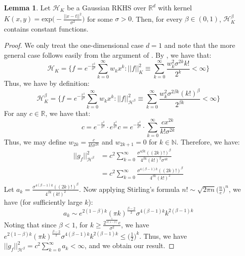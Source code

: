 \documentclass[accepted]{article}
\theoremstyle{definition}
\newtheorem{lemma}[theorem]{Lemma}
\begin{document}
\begin{lemma}
\label{Gaussian Interpolation Spaces include Constants}
Let $\mathcal{H}_K$ be a Gaussian RKHS over $\mathbb{R}^d$ with kernel $K(x, y) = \text{exp}\Big(-\frac{||x - t||^2}{\sigma^2}\Big)$ for some $\sigma > 0$. Then, for every $\beta \in (0, 1)$, $\mathcal{H}^{\beta}_K$ contains constant functions.
\end{lemma}
\begin{proof}
We only treat the one-dimensional case $d = 1$ and note that the more general case follows easily from the argument of \cite{steinwart2008support}. By \cite{minh2010some}, we have that:
\begin{equation*}
    \mathcal{H}_{K} = \Big\{f = e^{-\frac{x^2}{\sigma^2}}\sum_{k = 0}^{\infty} w_k x^{k}: ||f||_{K}^2 \equiv \sum_{k = 0}^{\infty} \frac{w^2_k \sigma^{2k} k!}{2^k} < \infty \Big\}
\end{equation*}
Thus, we have by definition:
\begin{equation*}
    \mathcal{H}^{\beta}_{K} = \Big\{f = e^{-\frac{x^2}{\sigma^2}}\sum_{k = 0}^{\infty} w_k x^{k}: ||f||_{\mathcal{H}^{\beta}}^2 \equiv \sum_{k = 0}^{\infty} \frac{w^2_k \sigma^{2\beta k} (k!)^{\beta}}{2^{\beta k}} < \infty \Big\}
\end{equation*}
For any $c \in \mathbb{R}$, we have that:
\begin{equation*}
    c = e^{-\frac{x^2}{\sigma^2}}  \cdot e^{\frac{x^2}{\sigma^2}} c = e^{-\frac{x^2}{\sigma^2}}  \cdot \sum_{k = 0}^{\infty} \frac{cx^{2k}}{k! \sigma^{2k}}
\end{equation*}
Thus, we may define $w_{2k} = \frac{c}{k! \sigma^{2k}}$ and $w_{2k+1} = 0$ for $k \in \mathbb{N}$. Therefore, we have:
\begin{align*}
    ||g_f||_{\mathcal{H}^{\beta}}^2 & = c^2\sum_{k = 0}^{\infty} \frac{\sigma^{4\beta k} ((2k)!)^{\beta}}{4^{\beta k}(k!)^2 \sigma^{4k}} \\
    & = c^2\sum_{k = 0}^{\infty} \frac{\sigma^{4(\beta - 1) k} ((2k)!)^{\beta}}{4^{\beta k}(k!)^2}
\end{align*}
Let $a_{k} = \frac{\sigma^{4(\beta - 1) k} ((2k)!)^{\beta}}{4^{\beta k}(k!)^2}$. Now applying Stirling's formula $n! \sim \sqrt{2\pi n} \Big(\frac{n}{e}\Big)^n$, we have (for sufficiently large $k$):
\begin{equation*}
    a_{k} \sim e^{2(1 - \beta)k}(\pi k)^{\frac{\beta - 2}{2}} \sigma^{4(\beta - 1) k} k^{2(\beta - 1)k} 
\end{equation*}
Noting that since $\beta < 1$, for $k \geq \frac{2^{\frac{1}{2(1- \beta)}}e}{\sigma^2}$, we have $e^{2(1 - \beta)k}(\pi k)^{\frac{\beta - 2}{2}} \sigma^{4(\beta - 1) k} k^{2(\beta - 1)k}  \leq \Big(\frac{1}{2}\Big)^{k}$. Thus, we have $||g_f||_{\mathcal{H}^{\beta}}^2 = c^2\sum_{k = 0}^{\infty} a_k < \infty$, and we obtain our result. 
\end{proof}
\end{document}
